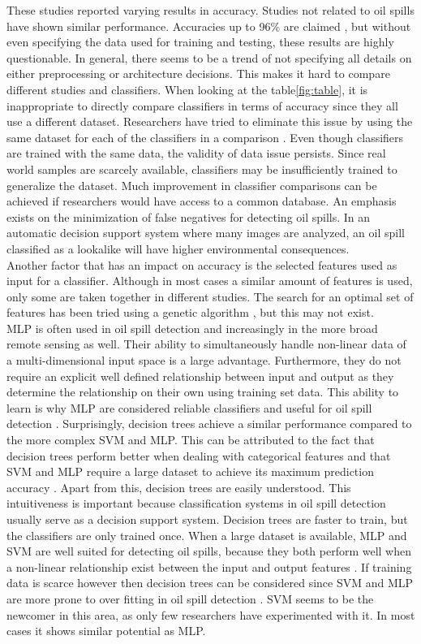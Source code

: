 These studies reported varying results in accuracy. Studies not related to oil spills have shown similar performance. Accuracies up to 96\% are claimed \cite{Topouzelis200924}, but without even specifying the data used for training and testing, these results are highly questionable. In general, there seems to be a trend of not specifying all details on either preprocessing or architecture decisions. This makes it hard to compare different studies and classifiers. When looking at the table\ref{fig:table}, it is inappropriate to directly compare classifiers in terms of accuracy since they all use a different dataset. Researchers have tried to eliminate this issue by using the same dataset for each of the classifiers in a comparison \cite{Mera201472, Xu201414}. Even though classifiers are trained with the same data, the validity of data issue persists. Since real world samples are scarcely available, classifiers may be insufficiently trained to generalize the dataset. Much improvement in classifier comparisons can be achieved if researchers would have access to a common database\cite{Topouzelis200810}. An emphasis exists on the minimization of false negatives for detecting oil spills. In an automatic decision support system where many images are analyzed, an oil spill classified as a lookalike will have higher environmental consequences.
\\
Another factor that has an impact on accuracy is the selected features used as input for a classifier. Although in most cases a similar amount of features is used, only some are taken together in different studies. The search for an optimal set of features has been tried using a genetic algorithm \cite{Topouzelis200930}, but this may not exist.
\\
MLP is often used in oil spill detection and increasingly in the more broad remote sensing as well. Their ability to simultaneously handle non-linear data of a multi-dimensional input space is a large advantage. Furthermore, they do not require an explicit well defined relationship between input and output as they determine the relationship on their own using training set data. This ability to learn is why MLP are considered reliable classifiers and useful for oil spill detection \cite{Delfrate200038}. Surprisingly, decision trees achieve a similar performance compared to the more complex SVM and MLP. This can be attributed to the fact that decision trees perform better when dealing with categorical features and that SVM and MLP require a large dataset to achieve its maximum prediction accuracy \cite{kotsiantis2007supervised}. Apart from this, decision trees are easily understood. This intuitiveness is important because classification systems in oil spill detection usually serve as a decision support system. Decision trees are faster to train, but the classifiers are only trained once. When a large dataset is available, MLP and SVM are well suited for detecting oil spills, because they both perform well when a non-linear relationship exist between the input and output features \cite{kotsiantis2007supervised}. If training data is scarce however then decision trees can be considered since SVM and MLP are more prone to over fitting in oil spill detection \cite{Xu201414}.
SVM seems to be the newcomer in this area, as only few researchers have experimented with it. In most cases it shows similar potential as MLP.